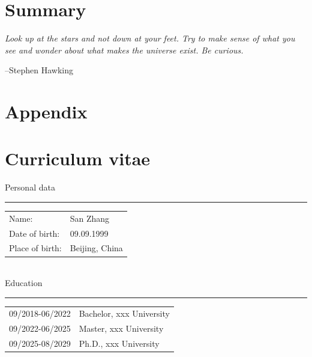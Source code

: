 \documentclass[12pt,openright]{book}
\begin{document}
\chapter{Summary}
\null
\vfill

\noindent \Large{\textit{Look up at the stars and not down at your feet. Try to make sense of what you see and wonder about what makes the universe exist. Be curious.}}

\hfill \large{--Stephen Hawking}

\vspace{25mm} %

\chapter*{Appendix}

{}


\listoffigures

\listoftables

\chapter*{Curriculum vitae}

\noindent Personal data

\noindent\rule{\textwidth}{0.4pt}

\vskip 0.1in

\begin{tabular}{p{}p{}}
  Name: & San Zhang \\
  Date of birth: & 09.09.1999 \\
  Place of birth: & Beijing, China \\
\end{tabular} \\

\noindent Education

\noindent\rule{\textwidth}{0.4pt}

\vskip 0.1in

\begin{tabular}{p{}p{}}
  09/2018-06/2022 & Bachelor, xxx University \\
  09/2022-06/2025 & Master, xxx University \\
  09/2025-08/2029 & Ph.D., xxx University \\
\end{tabular} \\
\end{document}
